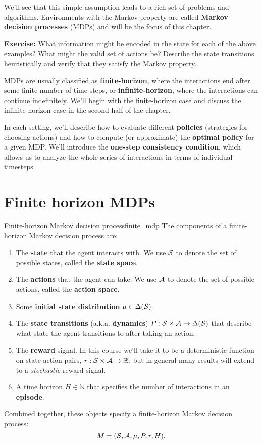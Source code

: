 \documentclass[\main/main]{subfiles}
\begin{document}
We'll see that this simple assumption leads to a rich set of problems and algorithms. Environments with the Markov property are called \textbf{Markov decision processes} (MDPs) and will be the focus of this chapter.

\textbf{Exercise:} What information might be encoded in the state for each of the above examples? What might the valid set of actions be? Describe the state transitions heuristically and verify that they satisfy the Markov property.

MDPs are usually classified as \textbf{finite-horizon}, where the interactions end after some finite number of time steps, or \textbf{infinite-horizon}, where the interactions can continue indefinitely. We'll begin with the finite-horizon case and discuss the infinite-horizon case in the second half of the chapter.

In each setting, we'll describe how to evaluate different \textbf{policies} (strategies for choosing actions) and how to compute (or approximate) the \textbf{optimal policy} for a given MDP. We'll introduce the \textbf{one-step consistency condition}, which allows us to analyze the whole series of interactions in terms of individual timesteps.

\newpage
\section{Finite horizon MDPs}


\begin{definition}{Finite-horizon Markov decision process}{finite_mdp}
The components of a finite-horizon Markov decision process are:

\begin{enumerate}
    \item The \textbf{state} that the agent interacts with. We use $\S$ to denote the set of possible states, called the \textbf{state space}.
    \item The \textbf{actions} that the agent can take. We use $\A$ to denote the set of possible actions, called the \textbf{action space}.
    \item Some \textbf{initial state distribution} $\mu \in \Delta(\S)$.
    \item The \textbf{state transitions} (a.k.a. \textbf{dynamics}) $P : \S \times \A \to \Delta(\S)$ that describe what state the agent transitions to after taking an action.
    \item The \textbf{reward} signal. In this course we'll take it to be a deterministic function on state-action pairs, $r : \S \times \A \to \mathbb{R}$, but in general many results will extend to a \emph{stochastic} reward signal.
    \item A time horizon $H \in \mathbb{N}$ that specifies the number of interactions in an \textbf{episode}.
\end{enumerate}

Combined together, these objects specify a finite-horizon Markov decision process:
\[
    M = (\S, \A, \mu, P, r, H).
\]
\end{definition}
\end{document}
